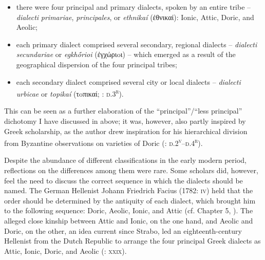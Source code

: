 \begin{itemize}
\item there were four principal and primary dialects, spoken by an entire tribe – \textit{dialecti} \textit{primariae}, \textit{principales}, or \textit{ethnikaí} (ἐθνικαί): Ionic, Attic, Doric, and Aeolic;

\item each primary dialect comprised several secondary, regional dialects – \textit{dialecti} \textit{secundariae} or \textit{egkhṓrioi} (ἐγχώριoι) – which emerged as a result of the geographical dispersion of the four principal tribes;

\item each secondary dialect comprised several city or local dialects – \textit{dialecti} \textit{urbicae} or \textit{topikaí} (τoπικαί; \citealt{Thryllitsch1709}: \textsc{d.3}\textsc{\textsuperscript{r}}).

\end{itemize}

This can be seen as a further elaboration of the “principal”/“less principal” dichotomy I have discussed in  above; it was, however, also partly inspired by Greek scholarship, as the author drew inspiration for his hierarchical division from Byzantine observations on varieties of Doric (\citealt{Thryllitsch1709}: \textsc{d.2}\textsc{\textsuperscript{v}}\textsc{–d.4}\textsc{\textsuperscript{r}}).

Despite the abundance of different classifications in the early modern period, reflections on the differences among them were rare. Some scholars did, however, feel the need to discuss the correct sequence in which the dialects should be named. The German Hellenist Johann Friedrich Facius (1782: \textsc{iv}) held that the order should be determined by the antiquity of each dialect, which brought him to the following sequence: Doric, Aeolic, Ionic, and Attic (cf. Chapter 5, ). The alleged close kinship between Attic and Ionic, on the one hand, and Aeolic and Doric, on the other, an idea current since Strabo, led an eighteenth-century Hellenist from the Dutch Republic to arrange the four principal Greek dialects as Attic, Ionic, Doric, and Aeolic (\citealt{Koen1766}: \textsc{xxix}).

